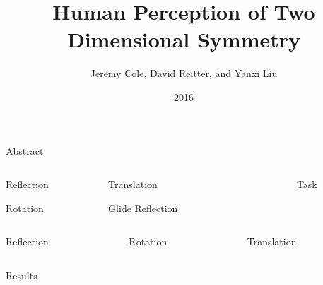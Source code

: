 \documentclass[final,hyperref={pdfpagelabels=false}]{beamer}
\title[Symmetry Perception]{Human Perception of Two Dimensional Symmetry}
\author[Cole \& Reitter \& Liu]{Jeremy Cole, David Reitter, and Yanxi Liu}
\institute[Penn State]{The Pennsylvania State University}
\date{2016}
\begin{document}
  \begin{frame}{} 
    \vfill
    \begin{block}{\LARGE Abstract}
      
    \end{block}    
    \vfill
    
    \begin{columns}[t]
    	\begin{column}{.12\linewidth}
    		\begin{block}{Reflection}
    		 
    		\end{block}
    		\vfill
    		\begin{block}{Rotation}
    		
    		\end{block}
    	\end{column}
    	\begin{column}{.12\linewidth}
    	\begin{block}{Translation}
				  		 
	  			\end{block}
	  			\vfill
    		\begin{block}{Glide Reflection}
    	    	
    	    \end{block}
    	    	\end{column}
    	\begin{column}{.24\linewidth}
   			   
    	\end{column}
    	\begin{column}{.48\linewidth}
    	\begin{block}{Task}
    	
    	\end{block}
    	\end{column}
    \end{columns}
    \begin{columns}[t]
       	\begin{column}{.31\linewidth}
       		\begin{block}{Reflection}
       		 
      		 
       		\end{block}
       	\end{column}
       	\begin{column}{.31\linewidth}
       		\begin{block}{Rotation}
      			
      			
      			\end{block}
       	\end{column}
       	\begin{column}{.31\linewidth}
      			\begin{block}{Translation}
   						 
     			\end{block}
     		\end{column}
    \end{columns}
	\begin{block}{Results}
    
    \end{block}
  \end{frame}
\end{document}

